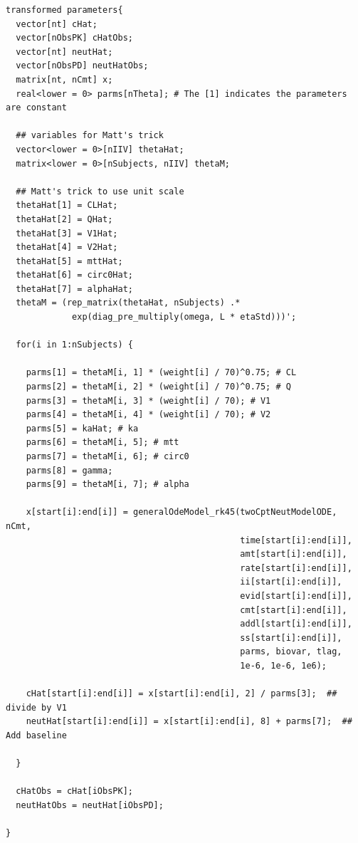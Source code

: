 \documentclass[10pt, reqno, oneside]{amsbook}
\numberwithin{equation}{chapter}
\numberwithin{figure}{chapter}
\numberwithin{table}{chapter}
\theoremstyle{remark}
\begin{document}
\begin{verbatim}
transformed parameters{
  vector[nt] cHat;
  vector[nObsPK] cHatObs;
  vector[nt] neutHat;
  vector[nObsPD] neutHatObs;
  matrix[nt, nCmt] x;
  real<lower = 0> parms[nTheta]; # The [1] indicates the parameters are constant

  ## variables for Matt's trick
  vector<lower = 0>[nIIV] thetaHat;
  matrix<lower = 0>[nSubjects, nIIV] thetaM; 

  ## Matt's trick to use unit scale
  thetaHat[1] = CLHat; 
  thetaHat[2] = QHat;
  thetaHat[3] = V1Hat;
  thetaHat[4] = V2Hat;
  thetaHat[5] = mttHat;
  thetaHat[6] = circ0Hat;
  thetaHat[7] = alphaHat;
  thetaM = (rep_matrix(thetaHat, nSubjects) .* 
             exp(diag_pre_multiply(omega, L * etaStd)))';

  for(i in 1:nSubjects) {

    parms[1] = thetaM[i, 1] * (weight[i] / 70)^0.75; # CL
    parms[2] = thetaM[i, 2] * (weight[i] / 70)^0.75; # Q
    parms[3] = thetaM[i, 3] * (weight[i] / 70); # V1
    parms[4] = thetaM[i, 4] * (weight[i] / 70); # V2
    parms[5] = kaHat; # ka
    parms[6] = thetaM[i, 5]; # mtt
    parms[7] = thetaM[i, 6]; # circ0
    parms[8] = gamma;
    parms[9] = thetaM[i, 7]; # alpha

    x[start[i]:end[i]] = generalOdeModel_rk45(twoCptNeutModelODE, nCmt,
                                              time[start[i]:end[i]], 
                                              amt[start[i]:end[i]], 
                                              rate[start[i]:end[i]], 
                                              ii[start[i]:end[i]], 
                                              evid[start[i]:end[i]], 
                                              cmt[start[i]:end[i]], 
                                              addl[start[i]:end[i]], 
                                              ss[start[i]:end[i]],
                                              parms, biovar, tlag,
                                              1e-6, 1e-6, 1e6);

    cHat[start[i]:end[i]] = x[start[i]:end[i], 2] / parms[3];  ## divide by V1
    neutHat[start[i]:end[i]] = x[start[i]:end[i], 8] + parms[7];  ## Add baseline

  }

  cHatObs = cHat[iObsPK];
  neutHatObs = neutHat[iObsPD];

}
\end{verbatim}
\end{document}
